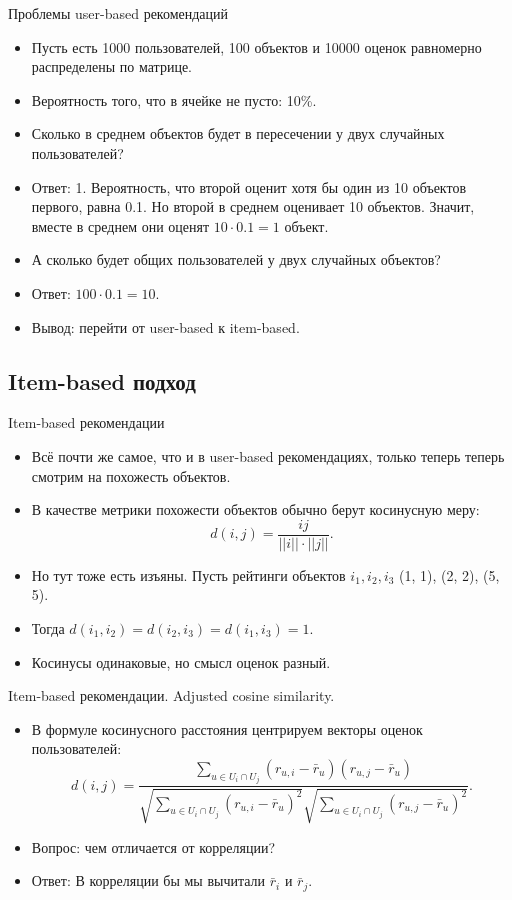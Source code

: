 \documentclass[9pt]{beamer}
\begin{document}
\begin{frame}{Проблемы user-based рекомендаций}
\begin{itemize}
    \item Пусть есть 1000 пользователей, 100 объектов и 10000 оценок равномерно распределены по матрице.
    \item Вероятность того, что в ячейке не пусто: 10\%.
    \item Сколько в среднем объектов будет в пересечении у двух случайных пользователей?
    \pause
    \item Ответ: 1. Вероятность, что второй оценит хотя бы один из 10 объектов первого, равна 0.1. Но второй в среднем оценивает 10 объектов. Значит, вместе в среднем они оценят $10\cdot 0.1 = 1$ объект.
    \item А сколько будет общих пользователей у двух случайных объектов?
    \pause
    \item Ответ: $100 \cdot 0.1 = 10$.
    \item Вывод: перейти от user-based к item-based.
\end{itemize}
\end{frame}

\subsection{Item-based подход}

\begin{frame}{Item-based рекомендации}
    \begin{itemize}
        \item Всё почти же самое, что и в user-based рекомендациях, только теперь теперь смотрим на похожесть объектов.
        \item В качестве метрики похожести объектов обычно берут косинусную меру:
        $$d(i, j) = \frac{ij}{||i||\cdot||j||}.$$
        \item Но тут тоже есть изъяны. Пусть рейтинги объектов $i_1, i_2, i_3$ (1, 1), (2, 2), (5, 5).
        \item Тогда $d(i_1, i_2) = d(i_2, i_3) = d(i_1, i_3) = 1$.
        \item Косинусы одинаковые, но смысл оценок разный.
    \end{itemize}
\end{frame}


\begin{frame}{Item-based рекомендации. Adjusted cosine similarity.}
    \begin{itemize}
        \item В формуле косинусного расстояния центрируем векторы оценок пользователей:
        $$d(i, j) = \frac{\sum\limits_{u\in U_{i}\cap U_{j}} (r_{u, i} - \bar r_{u}) (r_{u, j} - \bar r_{u})}{\sqrt{\sum\limits_{u\in U_i\cap U_j} (r_{u, i} - \bar r_u)^2} {\sqrt{\sum\limits_{u\in U_i\cap U_j} (r_{u, j} - \bar r_u)^2}}  }.$$
        \item Вопрос: чем отличается от корреляции?
        \pause
        \item Ответ: В корреляции бы мы вычитали $\bar r_i$ и $\bar r_j$.
    \end{itemize}
\end{frame}
\end{document}
